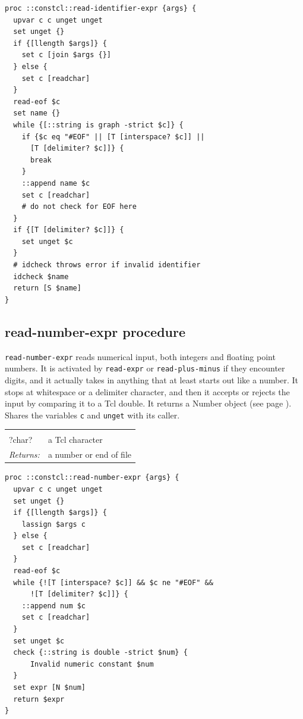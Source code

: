 \documentclass[twoside]{report}
\begin{document}
\begin{lstlisting}
proc ::constcl::read-identifier-expr {args} {
  upvar c c unget unget
  set unget {}
  if {[llength $args]} {
    set c [join $args {}]
  } else {
    set c [readchar]
  }
  read-eof $c
  set name {}
  while {[::string is graph -strict $c]} {
    if {$c eq "#EOF" || [T [interspace? $c]] ||
      [T [delimiter? $c]]} {
      break
    }
    ::append name $c
    set c [readchar]
    # do not check for EOF here
  }
  if {[T [delimiter? $c]]} {
    set unget $c
  }
  # idcheck throws error if invalid identifier
  idcheck $name
  return [S $name]
}
\end{lstlisting}

\subsection{read-number-expr procedure}
\label{readnumberexpr-procedure}

\texttt{read-number-expr} reads numerical input, both integers and floating point numbers. It is activated by \texttt{read-expr} or \texttt{read-plus-minus} if they encounter digits, and it actually takes in anything that at least starts out like a number. It stops at whitespace or a delimiter character, and then it accepts or rejects the input by comparing it to a Tcl double. It returns a Number object (see page \pageref{numbers}). Shares the variables \texttt{c} and \texttt{unget} with its caller.

\noindent\begin{tabular}{ |p{1.9cm} p{8cm}| }
\hline
\rowcolor[HTML]{CCCCCC} \multicolumn{2}{|l|}{\bf read-number-expr (internal)} \\
?char? & a Tcl character \\
\textit{Returns:} & a number or end of file \\
\hline
\end{tabular}

\begin{lstlisting}
proc ::constcl::read-number-expr {args} {
  upvar c c unget unget
  set unget {}
  if {[llength $args]} {
    lassign $args c
  } else {
    set c [readchar]
  }
  read-eof $c
  while {![T [interspace? $c]] && $c ne "#EOF" &&
      ![T [delimiter? $c]]} {
    ::append num $c
    set c [readchar]
  }
  set unget $c
  check {::string is double -strict $num} {
      Invalid numeric constant $num
  }
  set expr [N $num]
  return $expr
}
\end{lstlisting}
\end{document}
